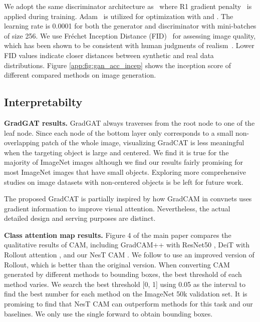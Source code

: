 \documentclass{article}
\newcommand{\topic}[1]{\noindent \textbf{#1}}
\newcommand{\OURS}{NesT\xspace}
\begin{document}
We adopt the same discriminator architecture as~\cite{karras2020analyzing} where R1 gradient penalty~\cite{mescheder2018training} is applied during training.  Adam~\cite{kingma2014adam} is utilized for optimization with  and . The learning rate is 0.0001 for both the generator and discriminator with mini-batches of size 256. We use Fr\'echet Inception Distance (FID)~\cite{heusel2017gans} for assessing image quality, which has been shown to be consistent with human judgments of realism~\cite{heusel2017gans,zhang2019consistency,zhang2021cross}. Lower FID values indicate closer distances between synthetic and real data distributions.
Figure \ref{app:fig:gan_acc_incep} shows the inception score of different compared methods on  image generation.


\subsection{Interpretabilty}
\label{app:interp}

\topic{GradGAT results.}
GradGAT always traverses from the root node to one of the leaf node. Since each node of the bottom layer only corresponds to a small non-overlapping patch of the whole image, visualizing GradCAT is less meaningful when the targeting object is large and centered. 
We find it is true for the majority of ImageNet images although we find our results fairly promising for most ImageNet images that have small objects. 
Exploring more comprehensive studies on image datasets with non-centered objects is be left for future work. 

The proposed GradCAT is partially inspired by how GradCAM \cite{selvaraju2017grad} in convnets uses gradient information to improve visual attention. Nevertheless, the actual detailed design and serving purposes are distinct. 


\topic{Class attention map results.}
Figure 4 of the main paper compares the qualitative results of CAM, including GradCAM++ \cite{chattopadhay2018grad} with ResNet50 \cite{he2016deep}, DeiT with Rollout attention \cite{abnar2020quantifying}, and our \OURS CAM \cite{zhou2016learning}. We follow \cite{gildenblat2021explorerollout} to use an improved version of Rollout, which is better than the original version. When converting CAM generated by different methods to bounding boxes, the best threshold of each method varies. We search the best threshold [0, 1] using 0.05 as the interval to find the best number for each method on the ImageNet 50k validation set. It is promising to find that \OURS CAM can outperform methods for this task and our baselines. We only use the single forward to obtain bounding boxes.
\end{document}
